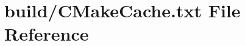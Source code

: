 \hypertarget{CMakeCache_8txt}{}\section{build/\+C\+Make\+Cache.txt File Reference}
\label{CMakeCache_8txt}

